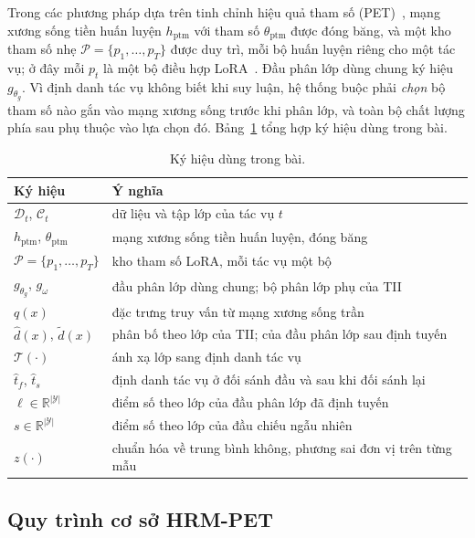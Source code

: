 \documentclass[runningheads]{llncs}
\begin{document}
Trong các phương pháp dựa trên tinh chỉnh hiệu quả tham số
(PET)~\cite{ref_l2p,ref_dualprompt,ref_hide}, mạng xương sống tiền huấn luyện
$h_{\mathrm{ptm}}$ với tham số $\theta_{\mathrm{ptm}}$ được đóng băng, và một kho
tham số nhẹ $\mathcal{P}=\{p_1,\dots,p_T\}$ được duy trì, mỗi bộ huấn luyện riêng
cho một tác vụ; ở đây mỗi $p_t$ là một bộ điều hợp LoRA~\cite{ref_lora}. Đầu phân
lớp dùng chung ký hiệu $g_{\theta_g}$. Vì định danh tác vụ không biết khi suy
luận, hệ thống buộc phải \emph{chọn} bộ tham số nào gắn vào mạng xương sống trước
khi phân lớp, và toàn bộ chất lượng phía sau phụ thuộc vào lựa chọn
đó. Bảng~\ref{tab:notation} tổng hợp ký hiệu dùng trong bài.

\begin{table}
\caption{Ký hiệu dùng trong bài.}\label{tab:notation}
\begin{tabular}{ll}
\hline
Ký hiệu & Ý nghĩa\\
\hline
$\mathcal{D}_t$, $\mathcal{C}_t$ & dữ liệu và tập lớp của tác vụ $t$\\
$h_{\mathrm{ptm}}$, $\theta_{\mathrm{ptm}}$ & mạng xương sống tiền huấn luyện, đóng băng\\
$\mathcal{P}=\{p_1,\dots,p_T\}$ & kho tham số LoRA, mỗi tác vụ một bộ\\
$g_{\theta_g}$, $g_\omega$ & đầu phân lớp dùng chung; bộ phân lớp phụ của TII\\
$q(x)$ & đặc trưng truy vấn từ mạng xương sống trần\\
$\hat{d}(x)$, $\tilde{d}(x)$ & phân bố theo lớp của TII; của đầu phân lớp sau định tuyến\\
$\mathcal{T}(\cdot)$ & ánh xạ lớp sang định danh tác vụ\\
$\hat{t}_f$, $\hat{t}_s$ & định danh tác vụ ở đối sánh đầu và sau khi đối sánh lại\\
$\ell \in \mathbb{R}^{|\mathcal{Y}|}$ & điểm số theo lớp của đầu phân lớp đã định tuyến\\
$s \in \mathbb{R}^{|\mathcal{Y}|}$ & điểm số theo lớp của đầu chiếu ngẫu nhiên\\
$z(\cdot)$ & chuẩn hóa về trung bình không, phương sai đơn vị trên từng mẫu\\
\hline
\end{tabular}
\end{table}

\subsection{Quy trình cơ sở HRM-PET}
\end{document}
